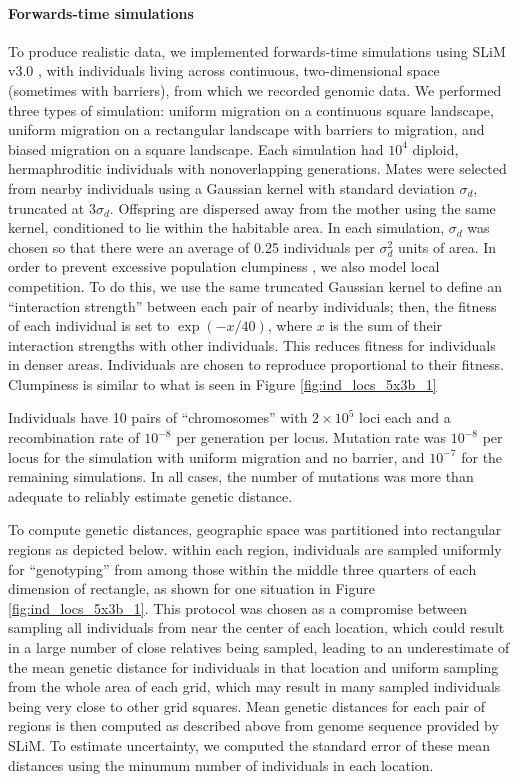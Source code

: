 \documentclass{article}
\begin{document}
\paragraph{Forwards-time simulations}
To produce realistic data, we implemented forwards-time simulations using SLiM v3.0 \citep{haller2017},
with individuals living across continuous, two-dimensional space (sometimes with barriers),
from which we recorded genomic data.
We performed three types of simulation:
uniform migration on a continuous square landscape, 
uniform migration on a rectangular landscape with barriers to migration, 
and biased migration on a square landscape.
Each simulation had $10^4$ diploid, hermaphroditic individuals with nonoverlapping generations.
Mates were selected from nearby individuals using a Gaussian kernel with standard deviation $\sigma_d$,
truncated at $3 \sigma_d$.
Offspring are dispersed away from the mother using the same kernel,
conditioned to lie within the habitable area.
In each simulation, $\sigma_d$ was chosen 
so that there were an average of 0.25 individuals per $\sigma_d^2$ units of area.
In order to prevent excessive population clumpiness \citep{felsensten1975pain}, 
we also model local competition. 
To do this, we use the same truncated Gaussian kernel to define an ``interaction strength''
between each pair of nearby individuals;
then, the fitness of each individual is set to $\exp(-x/40)$, 
where $x$ is the sum of their interaction strengths with other individuals.
This reduces fitness for individuals in denser areas.
Individuals are chosen to reproduce proportional to their fitness.
Clumpiness is similar to what is seen in 
Figure \ref{fig:ind_locs_5x3b_1}

Individuals have 10 pairs of ``chromosomes'' with $2 \times 10^5$ loci each 
and a recombination rate of $10^{-8}$ per generation per locus.
Mutation rate was $10^{-8}$ per locus for the simulation with uniform migration and no barrier,
and $10^{-7}$ for the remaining simulations.
In all cases, the number of mutations was more than adequate to reliably estimate genetic distance.

To compute genetic distances,
geographic space was partitioned into rectangular regions as depicted below.
within each region, 
individuals are sampled uniformly for ``genotyping'' 
from among those within the middle three quarters of each dimension of rectangle,
as shown for one situation in Figure \ref{fig:ind_locs_5x3b_1}.
This protocol was chosen as a compromise between sampling all individuals 
from near the center of each location,
which could result in a large number of close relatives being sampled, 
leading to an underestimate of the mean genetic distance for individuals in that location
and uniform sampling from the whole area of each grid, 
which may result in many sampled individuals being very close to other grid squares.
Mean genetic distances for each pair of regions is then computed as described above
from genome sequence provided by SLiM.
To estimate uncertainty, we computed the standard error of these mean distances
using the minumum number of individuals in each location.
\end{document}
